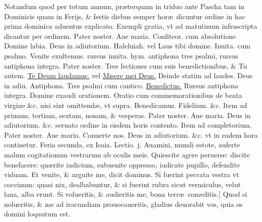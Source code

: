 \documentclass[a5paper,10pt]{book}
\def\leftmarginnote{%
	\lrmarginnote{\hskip -\marginparsep \hskip -6.5em}}
\def\ae{æ}
\begin{document}
\begin{multicols*}{2}
\newline {} \color{red} Notandum quod per totum annum, pr\ae terquam in triduo ante Pascha tam in Dominicis quam in Ferijs, \& festis diebus semper hor\ae \ dicuntur ordine in hac prima dominica aduentus explicato. Exempli gratia, vt ad matutinum infrascripta dicantur per ordinem. \color{black} Pater noster. Aue maria. Confiteor. \color{red} cum absolutione \color{black} Domine labia. Deus in adiutorium. Haleluiah. \color{red} vel \color{black} Laus tibi domine. \color{red} Inuita. cum psalmo. \color{black} Venite exultemus. \color{red} rursus inuita. hym. antiphona tres psalmi, rursus antiphona integra. \color{black} Pater noster. \color{red} Tres lectiones cum suis benedictionibus, \& \color{black} Tu autem. \hyperlink{tedeum}{Te Deum laudamus.} \color{red} vel \color{black} \hyperlink{ps50}{Misere mei Deus.} \color{red} Deinde statim ad laudes. \color{black} Deus in adiu. \color{red} Antiphona. Tres psalmi cum cantico. \color{black} \hyperlink{Benedictus}{Benedictus.} \color{red} Rursus antiphona integra. \color{black} Domine exaudi orationem. \color{red} Oratio cum commemorationibus de beata virgine \&c. nisi sint omittend\ae , vt supra. \color{black} Benedicamus. Fidelium. \&c. \color{red} Item ad primam, tertiam, sextam, nonam, \& vesperas. \color{black} Pater noster. Aue maria. Deus in adiutorium. \&c. \color{red} seruato ordine in eisdem horis contento. \color{black}
\newline {} \color{red} Item ad completorium. \color{black} Pater noster. Aue maria. Conuerte nos. Deus in adiutorium. \color{red} \&c. vt in eadem hora continetur. \color{black}
\newline \color{red} \hypertarget{MON-PRIMA-ADV}{Feria secunda,} ex Isaia. \hfill Lectio. j. \color{black}
\vspace{-1em}
\textdagger Auamini,\leftmarginnote{\begin{flushright}ca. 1.\\E\end{flushright}} mundi estote, auferte malum cogitationum vestrarum ab oculis meis.
Quiescite agere peruerse: discite benefacere: qu\ae rite iudicium, subuenite oppresso, iudicate pupillo, defendite viduam.
Et venite, \& arguite me, dicit dominus.
Si fuerint peccata vestra vt coccinum: quasi nix, dealbabuntur, \& si fuerint rubra sicut vermiculus, velut lana, alba erunt.
Si volueritis, \& audieritis me, bona terr\ae \ comeditis.]
Quod\leftmarginnote{\begin{flushright}F\end{flushright}} si nolueritis, \& me ad iracundiam prouocaueritis, gladius deuorabit vos, quia os domini loquutum est.

\end{multicols*}
\end{document}
